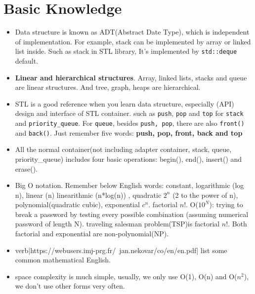 \documentclass[a4paper,11pt,twoside]{book}
\begin{document}
\section{Basic Knowledge}
\begin{itemize}
	\item Data structure is known as ADT(Abstract Date Type),  which is independent of implementation. For example, stack can be implemented by array or linked list inside. Such as stack in STL library, It's implemented by \texttt{std::deque} default.   
	
	\item \textbf{Linear and hierarchical structures}. Array, linked lists, stacks and queue are linear structures. And tree, graph, heaps are hierarchical.
	
	\item STL is a good reference when you learn data structure, especially (API) design and interface of STL container. such as \texttt{push}, \texttt{pop}  and \texttt{top} for \texttt{stack} and \texttt{priority\_queue}. For \texttt{queue}, besides \texttt{push, pop},  there are also \texttt{front()} and \texttt{back()}. Just remember five words: \textbf{push, pop, front, back and top}
	
	\item All the normal container(not including adapter container, stack, queue, priority\_queue) includes four basic operations: begin(), end(), insert() and erase(). 
	
	\item Big O notation. Remember below English words: constant, logarithmic (log n), linear (n)  linearithmic (n*log(n)) , quadratic $2^{n}$ (2 to the power of n), polynomial(quadratic cubic),  exponential $c^{n}$.  factorial $n!$.  O($10^{N}$): trying to break a password by testing every possible combination (assuming numerical password of length N).  traveling salesman problem(TSP)is factorial $n!$.  Both factorial and exponential are non-polynomial(NP). 
	
	\item verb|https://webusers.imj-prg.fr/~jan.nekovar/co/en/en.pdf| list some common mathematical English.  
	
	\item space complexity is much simple, usually, we only use O(1), O(n) and O($n^{2}$), we don't use other forms very often.  
\end{itemize}
\end{document}
